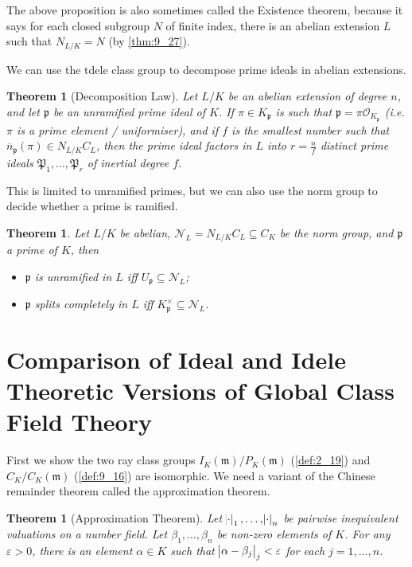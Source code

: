\documentclass[11pt]{article}
\theoremstyle{definition}
\theoremstyle{plain}
\newtheorem{theorem}[definition]{Theorem}
\theoremstyle{remark}
\newcommand{\cO}{\mathcal{O}}
\newcommand{\cp}{\mathfrak{P}}
\newcommand{\cN}{\mathcal{N}}
\newcommand{\fp}{\mathfrak{p}}
\newcommand{\fm}{\mathfrak{m}}
\begin{document}
The above proposition is also sometimes called the Existence theorem, because it says for each closed subgroup $N$ of finite index, there is an abelian extension $L$ such that $N_{L/K} = N$ (by \autoref{thm:9_27}).

We can use the tdele class group to decompose prime ideals in abelian extensions.

\begin{theorem}[Decomposition Law]\label{thm:9_30}
    Let $L/K$ be an abelian extension of degree $n$, and let $\fp$ be an unramified prime ideal of $K$. If $\pi \in K_\fp$ is such that $\fp = \pi \cO_{K_\fp}$ (i.e. $\pi$ is a prime element / uniformiser), and if $f$ is the smallest number such that $\overline{n}_\fp(\pi) \in N_{L/K} C_L$, then the prime ideal factors in $L$ into $r = \frac{n}{f}$ distinct prime ideals $\cp_1, \ldots, \cp_r$ of inertial degree $f$.
\end{theorem}

This is limited to unramified primes, but we can also use the norm group to decide whether a prime is ramified.

\begin{theorem}\label{thm:9_31}
    Let $L/K$ be abelian, $\cN_L = N_{L/K} C_L \subseteq C_K$ be the norm group, and $\fp$ a prime of $K$, then
    \begin{itemize}
        \item $\fp$ is unramified in $L$ iff $U_\fp \subseteq \cN_L$;
        \item $\fp$ splits completely in $L$ iff $K_\fp^\times \subseteq \cN_L$.
    \end{itemize}
\end{theorem}

\section{Comparison of Ideal and Idele Theoretic Versions of Global Class Field Theory}

First we show the two ray class groups $I_K(\fm) / P_K(\fm)$ (\autoref{def:2_19}) and $C_K / C_K(\fm)$ (\autoref{def:9_16}) are isomorphic. We need a variant of the Chinese remainder theorem called the approximation theorem.

\begin{theorem}[Approximation Theorem]\label{thm:10_1}
    Let $\abs{\cdot}_1, \ldots, \abs{\cdot}_n$ be pairwise inequivalent valuations on a number field. Let $\beta_1, \ldots, \beta_n$ be non-zero elements of $K$. For any $\varepsilon > 0$, there is an element $\alpha \in K$ such that $\abs{\alpha - \beta_j}_j < \varepsilon$ for each $j=1,\ldots,n$.
\end{theorem}
\end{document}
